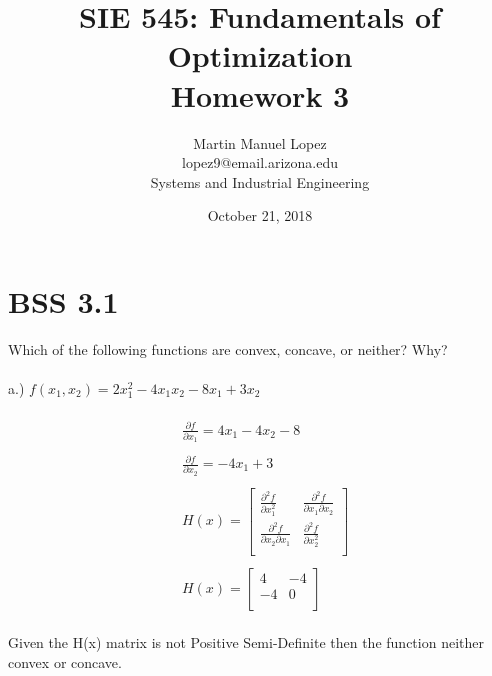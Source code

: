 \documentclass[12pt]{article}
\begin{document}
\title{SIE 545: Fundamentals of Optimization \\Homework 3}
\author{Martin Manuel Lopez \\lopez9@email.arizona.edu \\Systems and Industrial Engineering}
\date{October 21, 2018}
\maketitle
\section{BSS 3.1}   
Which of the following functions are convex, concave, or neither? Why?\\ \\
a.) $f(x_1,x_2) = 2x_1^2 - 4x_1x_2 - 8x_1 + 3x_2$\\\\
\begin{align*}
    &\frac{\partial f}{\partial x_1} = 4x_1 - 4x_2 -8\\ \\
    &\frac{\partial f}{\partial x_2} = -4x_1 +3 \\ \\  
        &H(x) = 
        \begin{bmatrix}
          \frac{\partial^2 f}{\partial x_1^2} & \frac{\partial^2 f}{\partial x_1 \partial x_2} \\
          \frac{\partial^2 f}{\partial x_2 \partial x_1} & \frac{\partial^2 f}{\partial x_2^2} \\
        \end{bmatrix} \\ \\
    &H(x) = 
        \begin{bmatrix}
            4 & -4 \\
            -4 & 0 \\
        \end{bmatrix}
\end{align*}\\

Given the H(x) matrix is not Positive Semi-Definite then the function neither convex or concave. \\ \\
\end{document}
